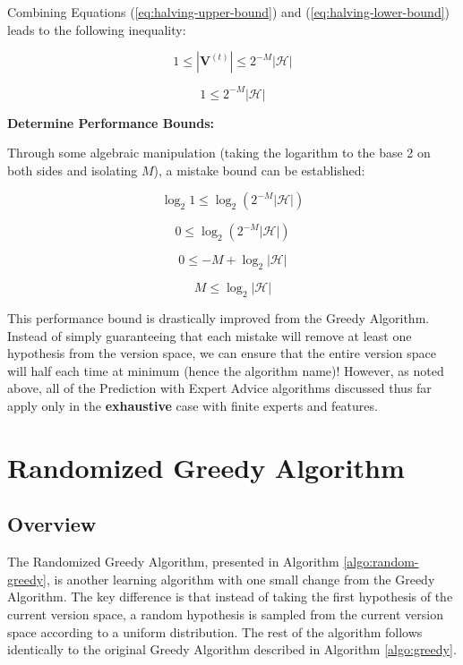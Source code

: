 \documentclass[11pt]{article}
\begin{document}
Combining Equations (\ref{eq:halving-upper-bound}) and (\ref{eq:halving-lower-bound}) leads to the following inequality:

$$1 \leq |\boldsymbol{V}^{(t)}| \leq  2^{-M}|\mathcal{H}|$$

$$1 \leq 2^{-M}|\mathcal{H}|$$

\textbf{Determine Performance Bounds:}

Through some algebraic manipulation (taking the logarithm to the base 2 on both sides and isolating $M$), a mistake bound can be established:



$$\log_2{1} \leq \log_2\left({2^{-M}|\mathcal{H}|}\right)$$

$$0 \leq \log_2\left({2^{-M}|\mathcal{H}|}\right)$$

$$0 \leq -M + \log_2{|\mathcal{H}|}$$

$$M \leq \log_2{|\mathcal{H}|}$$

This performance bound is drastically improved from the Greedy Algorithm. Instead of simply guaranteeing that each mistake will remove at least one hypothesis from the version space, we can ensure that the entire version space will half each time at minimum (hence the algorithm name)! However, as noted above, all of the Prediction with Expert Advice algorithms discussed thus far apply only in the \textbf{exhaustive} case with finite experts and features.

\section{Randomized Greedy Algorithm}

\subsection{Overview}

The Randomized Greedy Algorithm, presented in Algorithm \ref{algo:random-greedy}, is another learning algorithm with one small change from the Greedy Algorithm. The key difference is that instead of taking the first hypothesis of the current version space, a random hypothesis is sampled from the current version space according to a uniform distribution. The rest of the algorithm follows identically to the original Greedy Algorithm described in Algorithm \ref{algo:greedy}.
\end{document}
